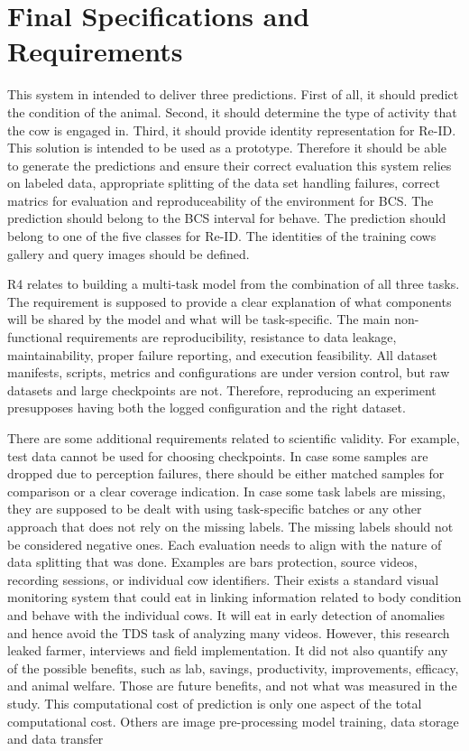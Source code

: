 \section{Final Specifications and Requirements}

This system in intended to deliver three predictions. First of all, it should predict the condition of the animal. Second, it should determine the type of activity that the cow is engaged in. Third, it should provide identity representation for Re-ID.   This solution is intended to be used as a prototype. Therefore it should be able to generate the predictions and ensure their correct evaluation this system relies on labeled data, appropriate splitting of the data set handling failures, correct matrics for evaluation and reproduceability of the environment for BCS. The prediction should belong to the BCS interval for behave. The prediction should belong to one of the five classes for Re-ID. The identities of the training cows gallery and query images should be defined.



R4 relates to building a multi-task model from the combination of all three tasks. The requirement is supposed to provide a clear explanation of what components will be shared by the model and what will be task-specific. The main non-functional requirements are reproducibility, resistance to data leakage, maintainability, proper failure reporting, and execution feasibility. All dataset manifests, scripts, metrics and configurations are under version control, but raw datasets and large checkpoints are not. Therefore, reproducing an experiment presupposes having both the logged configuration and the right dataset.

There are some additional requirements related to scientific validity. For example, test data cannot be used for choosing checkpoints. In case some samples are dropped due to perception failures, there should be either matched samples for comparison or a clear coverage indication. In case some task labels are missing, they are supposed to be dealt with using task-specific batches or any other approach that does not rely on the missing labels. The missing labels should not be considered negative ones. Each evaluation needs to align with the nature of data splitting that was done. Examples are bars protection, source videos, recording sessions, or individual cow identifiers. Their exists a standard visual monitoring system that could eat in linking information related to body condition and behave with the individual cows. It will eat in early detection of anomalies and hence avoid the TDS task of analyzing many videos. However, this research leaked farmer, interviews and field implementation. It did not also quantify any of the possible benefits, such as lab, savings, productivity, improvements, efficacy, and animal welfare. Those are future benefits, and not what was measured in the study. This computational cost of prediction is only one aspect of the total computational cost. Others are image pre-processing model training, data storage and data transfer

